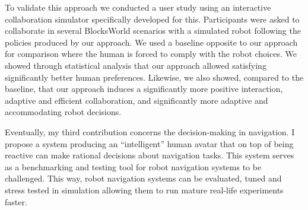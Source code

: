 To validate this approach we conducted a user study using an interactive collaboration simulator specifically developed for this. Participants were asked to collaborate in several BlocksWorld scenarios with a simulated robot following the policies produced by our approach. We used a baseline opposite to our approach for comparison where the human is forced to comply with the robot choices. We showed through statistical analysis that our approach allowed satisfying significantly better human preferences. Likewise, we also showed, compared to the baseline, that our approach induces a significantly more positive interaction, adaptive and efficient collaboration, and significantly more adaptive and accommodating robot decisions.

Eventually, my third contribution concerns the decision-making in navigation. I propose a system producing an ``intelligent'' human avatar that on top of being reactive can make rational decisions about navigation tasks. This system serves as a benchmarking and testing tool for robot navigation systems to be challenged. This way, robot navigation systems can be evaluated, tuned and stress tested in simulation allowing them to run mature real-life experiments faster.
